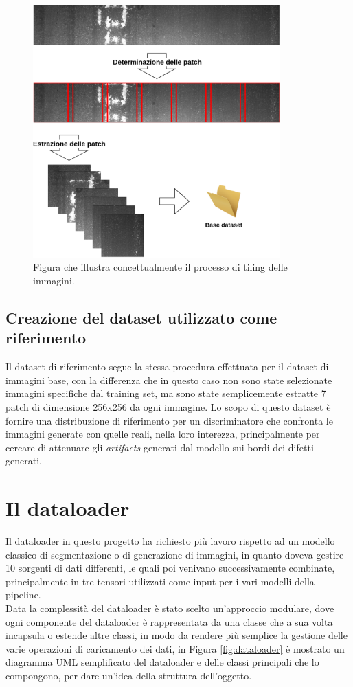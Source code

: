 \begin{figure}[H]
    \centering
    \includegraphics[width=0.85\textwidth]{imgs/Coigan/tilling_op.png}
    \caption{Figura che illustra concettualmente il processo di tiling delle immagini.}
    \label{fig:tiling}
\end{figure}

\subsection{Creazione del dataset utilizzato come riferimento}
Il dataset di riferimento segue la stessa procedura effettuata per il dataset di immagini base, con la differenza che in questo caso
non sono state selezionate immagini specifiche dal training set, ma sono state semplicemente estratte 7 patch di dimensione 256x256 da ogni immagine.
Lo scopo di questo dataset è fornire una distribuzione di riferimento per un discriminatore che confronta le immagini generate con quelle reali,
nella loro interezza, principalmente per cercare di attenuare gli \textit{artifacts} generati dal modello sui bordi dei difetti generati.



\section{Il dataloader}
Il dataloader in questo progetto ha richiesto più lavoro rispetto ad un modello classico di segmentazione o di generazione di immagini,
in quanto doveva gestire 10 sorgenti di dati differenti, le quali poi venivano successivamente combinate, principalmente in tre tensori
utilizzati come input per i vari modelli della pipeline.\\
Data la complessità del dataloader è stato scelto un'approccio modulare, dove ogni componente del dataloader è rappresentata da una classe
che a sua volta incapsula o estende altre classi, in modo da rendere più semplice la gestione delle varie operazioni di caricamento dei dati,
in Figura \ref{fig:dataloader} è mostrato un diagramma UML semplificato del dataloader e delle classi principali che lo compongono, per dare un'idea
della struttura dell'oggetto.\\

